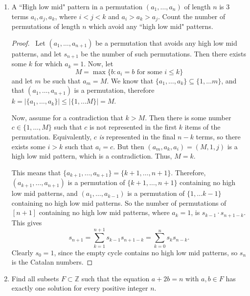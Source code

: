 \documentclass[12pt]{article}
\newcommand{\Z}{\mathbb{Z}}
\begin{document}
\begin{enumerate}[leftmargin=0cm,itemindent=.5cm,labelwidth=\itemindent,labelsep=0cm,align=left]
\item A ``High low mid" pattern in a permutation $(a_1, \dots , a_n)$ of length $n$ is 3 terms $a_i, a_j, a_k$, where $i < j < k$ and $a_i > a_k > a_j$.  Count the number of permutations of length $n$ which avoid any ``high low mid" patterns.

\begin{proof}
\ Let $(a_1, \dots , a_{n+1})$ be a permutation that avoids any high low mid patterns, and let $s_{n+1}$ be the number of such permutations.  Then there exists some $k$ for which $a_k = 1$.  Now, let
$$
M = \max \{b : a_i = b \text{ for some } i \leq k \}
$$
and let $m$ be such that $a_m = M$.
We know that $\{a_1, \dots, a_k\} \subseteq \{1, \dots m \}$, and that $(a_1, \dots , a_{n+1})$ is a permutation, therefore $k = |\{a_1, \dots, a_k\}| \leq |\{1, \dots M \}| = M$.

Now, assume for a contradiction that $k > M$.  Then there is some number $c \in \{1, \dots , M\}$ such that $c$ is not represented in the first $k$ items of the permutation.  Equivalently, $c$ \emph{is} represented in the final $n-k$ terms, so there exists some $i > k$ such that $a_i = c$.  But then $(a_m, a_k, a_i) = (M,1,j)$ is a high low mid pattern, which is a contradiction.  Thus, $M = k$.

This means that $\{a_{k+1}, \dots , a_{n+1} \} = \{k+1, \dots , n+1\}$.  Therefore, $(a_{k+1}, \dots , a_{n+1})$ is a permutation of $\{k+1, \dots , n+1\}$ containing no high low mid patterns, and $(a_1, \dots , a_{k-1})$ is a permutation of $\{1, \dots k-1\}$ containing no high low mid patterns.  So the number of permutations of $[n+1]$ containing no high low mid patterns, where $a_k = 1$, is $s_{k-1} \cdot s_{n+1-k}$.  This gives
$$
s_{n+1} = \sum\limits_{k=1}^{n+1} s_{k-1}s_{n+1-k} = \sum\limits_{k=0}^{n} s_{k}s_{n-k}.
$$
Clearly $s_0 = 1$, since the empty cycle contains no high low mid patterns, so $s_n$ is the Catalan numbers.
\end{proof}

\item Find all subsets $F \subset \Z$ such that the equation $a + 2b = n$ with $a,b \in F$ has exactly one solution for every positive integer $n$.


\end{enumerate}
\end{document}
